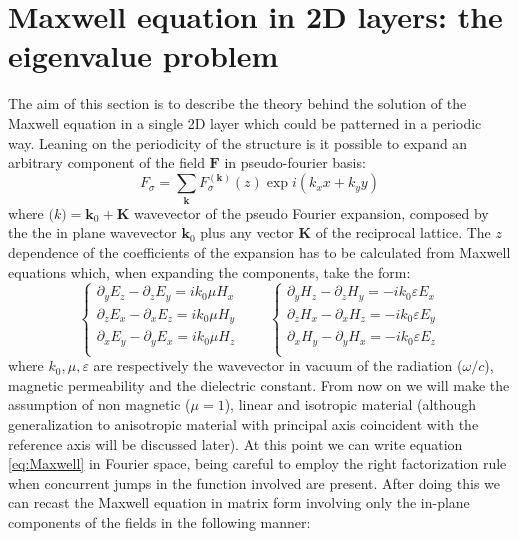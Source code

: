 \documentclass[a4paper,10pt]{report}
\begin{document}
\section{Maxwell equation in 2D layers: the eigenvalue problem} \label{sec:eigenploblem}
The aim of this section is to describe the theory behind the solution of the Maxwell equation in a single 2D layer which could be patterned in a periodic way. Leaning on the periodicity of the structure is it possible to expand an arbitrary component of the field $\mathbf{F}$ in pseudo-fourier basis:
\begin{equation} \label{eq_Fourier_exp}
F_\sigma = \sum_\mathbf{k}F_\sigma^{(\mathbf{k})}(z)\exp{i(k_xx+k_yy)}
\end{equation} 
where $\mathbf(k)=\mathbf{k}_0 + \mathbf{K}$ wavevector of the pseudo Fourier expansion, composed by the the in plane wavevector $\mathbf{k}_0$ plus any vector $\mathbf{K}$ of the reciprocal lattice. The $z$ dependence of the coefficients of the expansion has to be calculated from Maxwell equations which, when expanding the components, take the form:
\begin{equation} \label{eq:Maxwell}
\left\{\begin{array}{c}
\partial_y E_z - \partial_z E_y = ik_0 \mu H_x \\
\partial_z E_x - \partial_x E_z = ik_0 \mu H_y \\
\partial_x E_y - \partial_y E_x = ik_0 \mu H_z \\
\end{array} \right.
\qquad
\left\{\begin{array}{c}
\partial_y H_z - \partial_z H_y = -ik_0 \varepsilon E_x \\
\partial_z H_x - \partial_x H_z = -ik_0 \varepsilon E_y \\
\partial_x H_y - \partial_y H_x = -ik_0 \varepsilon E_z \\
\end{array} \right.
\end{equation}  
where $k_0,\mu,\varepsilon$ are respectively the wavevector in vacuum of the radiation ($\omega/c$), magnetic permeability and the dielectric constant. From now on we will make the assumption of non magnetic ($\mu=1$), linear and isotropic material (although generalization to anisotropic material with principal axis coincident with the reference axis will be discussed later).
At this point we can write equation \ref{eq:Maxwell} in Fourier space, being careful to employ the right factorization rule when concurrent jumps in the function involved are present. After doing this we can recast the Maxwell equation in matrix form involving only the in-plane components of the fields in the following manner:
\end{document}
